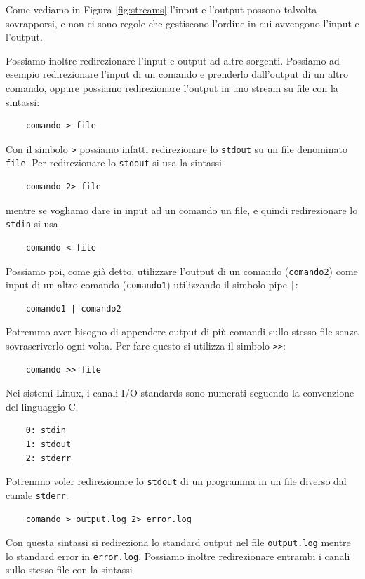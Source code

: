 Come vediamo in Figura \ref{fig:streams} l'input e l'output possono talvolta sovrapporsi, e non ci sono regole che gestiscono l'ordine in cui avvengono l'input e l'output. 

Possiamo inoltre redirezionare l'input e output ad altre sorgenti. Possiamo ad esempio redirezionare l'input di un comando e prenderlo dall'output di un altro comando, oppure possiamo redirezionare l'output in uno stream su file con la sintassi:
\begin{verbatim}
	comando > file
\end{verbatim} 

Con il simbolo \verb">" possiamo infatti redirezionare lo \verb"stdout" su un file denominato \verb"file". Per redirezionare lo \verb"stdout" si usa la sintassi

\begin{verbatim}
	comando 2> file
\end{verbatim}

mentre se vogliamo dare in input ad un comando un file, e quindi redirezionare lo \verb"stdin" si usa
\begin{verbatim}
	comando < file
\end{verbatim}

Possiamo poi, come già detto, utilizzare l'output di un comando (\verb"comando2") come input di un altro comando (\verb"comando1") utilizzando il simbolo pipe \verb"|":
\begin{verbatim}
	comando1 | comando2
\end{verbatim}

Potremmo aver bisogno di appendere output di più comandi sullo stesso file senza sovrascriverlo ogni volta. Per fare questo si utilizza il simbolo \verb">>":
\begin{verbatim}
	comando >> file
\end{verbatim}

Nei sistemi Linux, i canali I/O standards sono numerati seguendo la convenzione del linguaggio C. \begin{verbatim}
	0: stdin
	1: stdout
	2: stderr
\end{verbatim}
Potremmo voler redirezionare lo \verb"stdout" di un programma in un file diverso dal canale \verb"stderr". 
\begin{verbatim}
	comando > output.log 2> error.log
\end{verbatim}
Con questa sintassi si redireziona lo standard output nel file \verb"output.log" mentre lo standard error in \verb"error.log". Possiamo inoltre redirezionare entrambi i canali sullo stesso file con la sintassi

